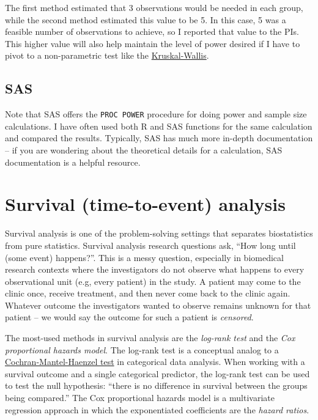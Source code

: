 \documentclass[
]{book}
\begin{document}
The first method estimated that 3 observations would be needed in each group, while the second method estimated this value to be 5. In this case, 5 was a feasible number of observations to achieve, so I reported that value to the PIs. This higher value will also help maintain the level of power desired if I have to pivot to a non-parametric test like the \href{https://en.wikipedia.org/wiki/Kruskal\%E2\%80\%93Wallis_one-way_analysis_of_variance}{Kruskal-Wallis}.

\hypertarget{sas}{%
\section{SAS}\label{sas}}

Note that SAS offers the \texttt{PROC\ POWER} procedure for doing power and sample size calculations. I have often used both R and SAS functions for the same calculation and compared the results. Typically, SAS has much more in-depth documentation -- if you are wondering about the theoretical details for a calculation, SAS documentation is a helpful resource.

\hypertarget{survival-time-to-event-analysis}{%
\chapter{Survival (time-to-event) analysis}\label{survival-time-to-event-analysis}}

Survival analysis is one of the problem-solving settings that separates biostatistics from pure statistics. Survival analysis research questions ask, ``How long until (some event) happens?''. This is a messy question, especially in biomedical research contexts where the investigators do not observe what happens to every observational unit (e.g, every patient) in the study. A patient may come to the clinic once, receive treatment, and then never come back to the clinic again. Whatever outcome the investigators wanted to observe remains unknown for that patient -- we would say the outcome for such a patient is \emph{censored}.

The most-used methods in survival analysis are the \emph{log-rank test} and the \emph{Cox proportional hazards model}. The log-rank test is a conceptual analog to a \href{https://en.wikipedia.org/wiki/Cochran\%E2\%80\%93Mantel\%E2\%80\%93Haenszel_statistics}{Cochran-Mantel-Haenzel test} in categorical data analysis. When working with a survival outcome and a single categorical predictor, the log-rank test can be used to test the null hypothesis: ``there is no difference in survival between the groups being compared.'' The Cox proportional hazards model is a multivariate regression approach in which the exponentiated coefficients are the \emph{hazard ratios}.
\end{document}
